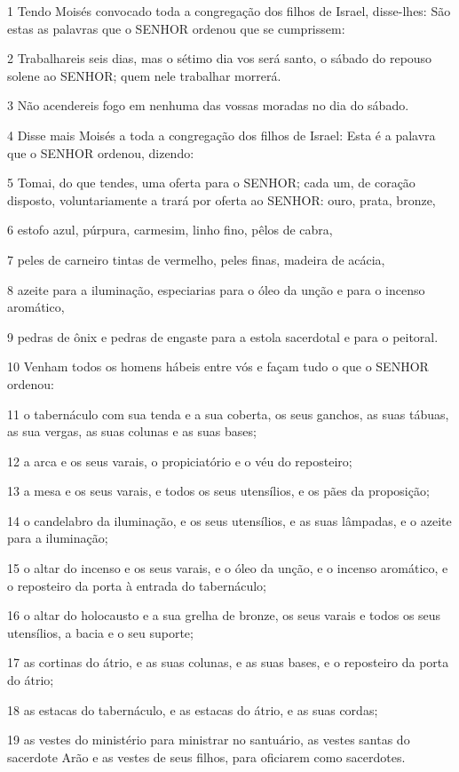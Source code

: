 \par 1 Tendo Moisés convocado toda a congregação dos filhos de Israel, disse-lhes: São estas as palavras que o SENHOR ordenou que se cumprissem:
\par 2 Trabalhareis seis dias, mas o sétimo dia vos será santo, o sábado do repouso solene ao SENHOR; quem nele trabalhar morrerá.
\par 3 Não acendereis fogo em nenhuma das vossas moradas no dia do sábado.
\par 4 Disse mais Moisés a toda a congregação dos filhos de Israel: Esta é a palavra que o SENHOR ordenou, dizendo:
\par 5 Tomai, do que tendes, uma oferta para o SENHOR; cada um, de coração disposto, voluntariamente a trará por oferta ao SENHOR: ouro, prata, bronze,
\par 6 estofo azul, púrpura, carmesim, linho fino, pêlos de cabra,
\par 7 peles de carneiro tintas de vermelho, peles finas, madeira de acácia,
\par 8 azeite para a iluminação, especiarias para o óleo da unção e para o incenso aromático,
\par 9 pedras de ônix e pedras de engaste para a estola sacerdotal e para o peitoral.
\par 10 Venham todos os homens hábeis entre vós e façam tudo o que o SENHOR ordenou:
\par 11 o tabernáculo com sua tenda e a sua coberta, os seus ganchos, as suas tábuas, as sua vergas, as suas colunas e as suas bases;
\par 12 a arca e os seus varais, o propiciatório e o véu do reposteiro;
\par 13 a mesa e os seus varais, e todos os seus utensílios, e os pães da proposição;
\par 14 o candelabro da iluminação, e os seus utensílios, e as suas lâmpadas, e o azeite para a iluminação;
\par 15 o altar do incenso e os seus varais, e o óleo da unção, e o incenso aromático, e o reposteiro da porta à entrada do tabernáculo;
\par 16 o altar do holocausto e a sua grelha de bronze, os seus varais e todos os seus utensílios, a bacia e o seu suporte;
\par 17 as cortinas do átrio, e as suas colunas, e as suas bases, e o reposteiro da porta do átrio;
\par 18 as estacas do tabernáculo, e as estacas do átrio, e as suas cordas;
\par 19 as vestes do ministério para ministrar no santuário, as vestes santas do sacerdote Arão e as vestes de seus filhos, para oficiarem como sacerdotes.
